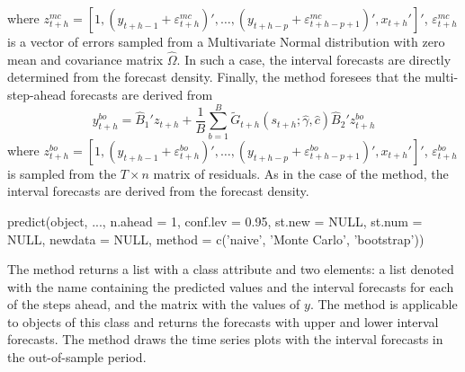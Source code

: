 where $z_{t+h}^{mc} = \left[1, \left(y_{t+h-1}+\varepsilon_{t+h}^{mc}\right)', \ldots, \left(y_{t+h-p}+\varepsilon_{t+h-p+1}^{mc}\right)', x_{t+h}'\right]'$,  $\varepsilon_{t+h}^{mc}$ is a vector of errors sampled from a Multivariate Normal distribution with zero mean and covariance matrix $\hat{\Omega}$. In such a case, the interval forecasts are directly determined from the forecast density. Finally, the  method foresees that the multi-step-ahead forecasts are derived from
\begin{equation*}
	y_{t+h}^{bo} = \hat{B}_1'z_{t+h} + \frac{1}{B}\sum_{b=1}^{B} \tilde{G}_{t+h}\left(s_{t+h}; \hat{\gamma}, \hat{c}\right)\hat{B}_2'z_{t+h}^{bo}
\end{equation*}
where $z_{t+h}^{bo} = \left[1, \left(y_{t+h-1}+\varepsilon_{t+h}^{bo}\right)', \ldots, \left(y_{t+h-p}+\varepsilon_{t+h-p+1}^{bo}\right)', x_{t+h}'\right]'$, $\varepsilon_{t+h}^{bo}$ is sampled from the $T \times n$ matrix of residuals. As in the case of the  method, the interval forecasts are derived from the forecast density.
%
\begin{example}
	predict(object, ..., n.ahead = 1, conf.lev = 0.95, st.new = NULL, 
	st.num = NULL, newdata = NULL, 
	method = c('naive', 'Monte Carlo', 'bootstrap'))
\end{example}
%
The  method returns a list with a class attribute  and two elements: a list denoted with the name  containing the predicted values and the interval forecasts for each of the steps ahead, and the matrix with the values of $y$. The  method is applicable to objects of this class and returns the forecasts with upper and lower interval forecasts. The  method draws the time series plots with the interval forecasts in the out-of-sample period.



